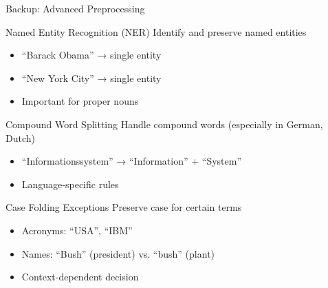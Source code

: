 \documentclass[aspectratio=169]{beamer}
\newif\ifanimated
\newcommand{\cpause}{\ifanimated\pause\fi}
\begin{document}
\begin{frame}[shrink=15]{Backup: Advanced Preprocessing}
\begin{block}{Named Entity Recognition (NER)}
Identify and preserve named entities
\begin{itemize}
    \item ``Barack Obama'' → single entity
    \item ``New York City'' → single entity
    \item Important for proper nouns
\end{itemize}
\cpause
\end{block}
\cpause
\begin{block}{Compound Word Splitting}
Handle compound words (especially in German, Dutch)
\begin{itemize}
    \item ``Informationssystem'' → ``Information'' + ``System''
    \item Language-specific rules
\end{itemize}
\cpause
\end{block}
\cpause
\begin{block}{Case Folding Exceptions}
Preserve case for certain terms
\begin{itemize}
    \item Acronyms: ``USA'', ``IBM''
    \item Names: ``Bush'' (president) vs. ``bush'' (plant)
    \item Context-dependent decision
\end{itemize}
\end{block}
\end{frame}
\end{document}
